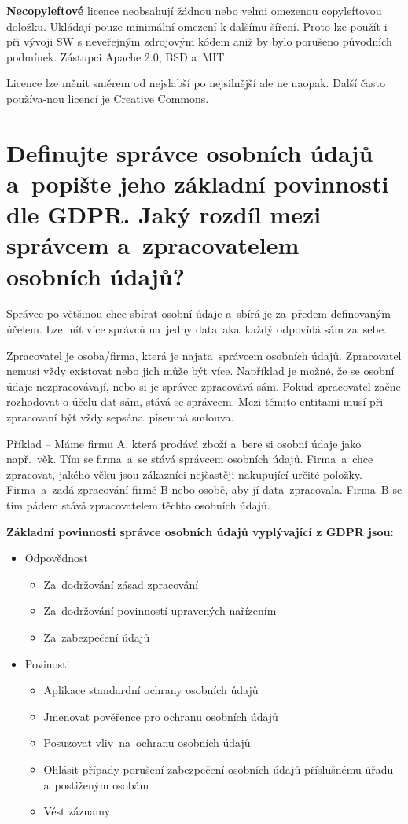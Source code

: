 \textbf{Necopyleftové} licence neobsahují žádnou nebo velmi omezenou copyleftovou doložku. Ukládají pouze minimální omezení k dalšímu šíření. Proto lze použít i při vývoji SW s neveřejným zdrojovým kódem aniž by bylo porušeno původních podmínek. Zástupci Apache 2.0, BSD a~MIT\@.

Licence lze měnit směrem od nejslabší po nejsilnější ale ne naopak. Další často používa-nou licencí je Creative Commons.


\section{Definujte správce osobních údajů a~popište jeho základní povinnosti dle GDPR\@. Jaký rozdíl mezi správcem a~zpracovatelem osobních údajů?}

Správce po většinou chce sbírat osobní údaje a~sbírá je za~předem definovaným účelem. Lze mít více správců na~jedny data~aka~každý odpovídá sám za~sebe.

Zpracovatel je osoba/firma, která je najata~správcem osobních údajů. Zpracovatel nemusí vždy existovat nebo jich může být více. Například je možné, že se osobní údaje nezpracovávají, nebo si je správce zpracovává sám. Pokud zpracovatel začne rozhodovat o účelu dat sám, stává se správcem. Mezi těmito entitami musí při zpracovaní být vždy sepsána~písemná smlouva.

Příklad -- Máme firmu A, která prodává zboží a~bere si osobní údaje jako např.\ věk. Tím se firma~a~se stává správcem osobních údajů. Firma~a~chce zpracovat, jakého věku jsou zákazníci nejčastěji nakupující určité položky. Firma~a~zadá zpracování firmě B nebo osobě, aby jí data~zpracovala. Firma~B se tím pádem stává zpracovatelem těchto osobních údajů.
\newline

\noindent\textbf{Základní povinnosti správce osobních údajů vyplývající z GDPR jsou:}
\begin{itemize}[noitemsep]
    \item Odpovědnost
          \begin{itemize}[noitemsep]
              \item Za~dodržování zásad zpracování
              \item Za~dodržování povinností upravených nařízením
              \item Za~zabezpečení údajů
          \end{itemize}
    \item Povinosti
          \begin{itemize}[noitemsep]
              \item Aplikace standardní ochrany osobních údajů
              \item Jmenovat pověřence pro ochranu osobních údajů
              \item Posuzovat vliv~na~ochranu osobních údajů
              \item Ohlásit případy porušení zabezpečení osobních údajů příslušnému úřadu a~postiženým osobám
              \item Vést záznamy
          \end{itemize}
\end{itemize}

